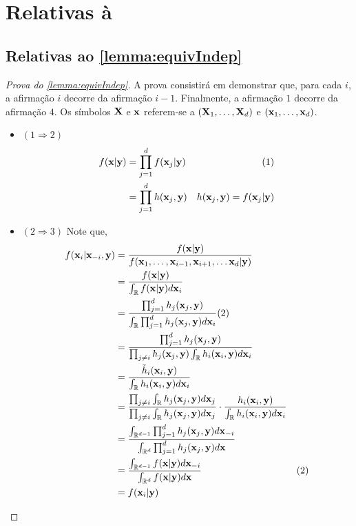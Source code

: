 \section{Relativas à }

\subsection{Relativas ao \cref{lemma:equivIndep}}

\begin{proof}[Prova do \cref{lemma:equivIndep}]
 A prova consistirá em demonstrar que,
 para cada $i$, a afirmação $i$ decorre da afirmação $i-1$.
 Finalmente, a afirmação $1$ decorre da afirmação $4$.
 Os símbolos ${\mathbf{X}}$ e ${\mathbf{x}}$ referem-se a 
 $({\mathbf{X}}_1,\ldots,{\mathbf{X}}_d)$ e $({\mathbf{x}}_1,\ldots,{\mathbf{x}}_d)$. 
 \begin{itemize}
  \item $(1 \Longrightarrow 2)$
	\begin{align*}
	 f({\mathbf{x}}|{\mathbf{y}})	&= \prod_{j=1}^{d}{f({\mathbf{x}}_j|{\mathbf{y}})}  & (1) \\
	          &= \prod_{j=1}^{d}{h({\mathbf{x}}_j,{\mathbf{y}})}
	          & h({\mathbf{x}}_j,{\mathbf{y}}) = f({\mathbf{x}}_j|{\mathbf{y}})
	\end{align*}
	\vspace{-5mm}
  \item $(2 \Longrightarrow 3)$ Note que,
	\begin{align*}
	 f({\mathbf{x}}_i|{\mathbf{x}}_{-i},{\mathbf{y}})	
	 &= \frac{f({\mathbf{x}}|{\mathbf{y}})}{f({\mathbf{x}}_1,\ldots,{\mathbf{x}}_{i-1},{\mathbf{x}}_{i+1},\ldots{\mathbf{x}}_d|{\mathbf{y}})}	\\
	 &= \frac{f({\mathbf{x}}|{\mathbf{y}})}{\int_{\mathbb{R}}{f({\mathbf{x}}|{\mathbf{y}})d{\mathbf{x}}_i}} \\
	 &= \frac{\prod_{j=1}^{d}{h_j({\mathbf{x}}_j,{\mathbf{y}})}}
	 {\int_{\mathbb{R}}{\prod_{j=1}^{d}{h_j({\mathbf{x}}_j,{\mathbf{y}})}d{\mathbf{x}}_i}} (2) \\
	 &= \frac{\prod_{j=1}^{d}{h_j({\mathbf{x}}_j,{\mathbf{y}})}}
	 {\prod_{j \neq i}{h_j({\mathbf{x}}_j,{\mathbf{y}})} \int_{\mathbb{R}}{h_i({\mathbf{x}}_i,{\mathbf{y}})d{\mathbf{x}}_i}}	\\
	 &= \frac{\tilde{h}_i({\mathbf{x}}_i,{\mathbf{y}})}{\int_{\mathbb{R}}{h_i({\mathbf{x}}_i,{\mathbf{y}})d{\mathbf{x}}_i}}	\\
	 &= \frac{\prod_{j \neq i}{\int_{\mathbb{R}}{h_j({\mathbf{x}}_j,{\mathbf{y}})d{\mathbf{x}}_j}}}
	 {\prod_{j \neq i}{\int_{\mathbb{R}}{h_j({\mathbf{x}}_j,{\mathbf{y}})d{\mathbf{x}}_j}}} \cdot 
	 \frac{h_i({\mathbf{x}}_i,{\mathbf{y}})}{\int_{\mathbb{R}}{h_i({\mathbf{x}}_i,{\mathbf{y}})d{\mathbf{x}}_i}}	\\
	 &= \frac{\int_{\mathbb{R}^{d-1}}{\prod_{j=1}^{d}{h_j({\mathbf{x}}_j,{\mathbf{y}})}d{\mathbf{x}}_{-i}}}
	 {\int_{\mathbb{R}^{d}}{\prod_{j=1}^{d}{h_j({\mathbf{x}}_j,{\mathbf{y}})}d{\mathbf{x}}}}	\\
	 &= \frac{\int_{\mathbb{R}^{d-1}}{f({\mathbf{x}}|{\mathbf{y}})d{\mathbf{x}}_{-i}}}
	 {\int_{\mathbb{R}^{d}}{f({\mathbf{x}}|{\mathbf{y}})d{\mathbf{x}}}} & (2) \\
	 &= f({\mathbf{x}}_i|{\mathbf{y}})
	\end{align*}


\end{itemize}
\end{proof}
